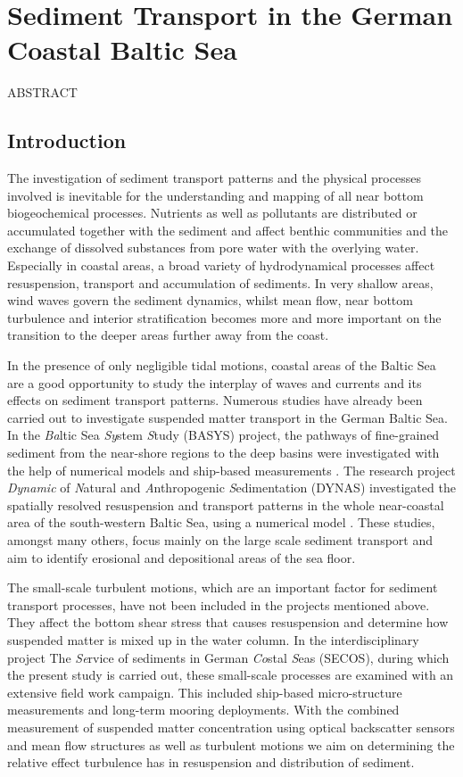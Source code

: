 \chapter{Sediment Transport in the German Coastal Baltic Sea}
\label{kap-measure}

ABSTRACT

\section{Introduction}

The investigation of sediment transport patterns and the physical processes 
involved is inevitable for the understanding and mapping of all near bottom 
biogeochemical processes. Nutrients as well as pollutants are distributed or 
accumulated together with the sediment and affect benthic communities and the 
exchange of dissolved substances from pore water with the overlying water. 
Especially in coastal areas, a broad variety of hydrodynamical processes affect 
resuspension, transport and accumulation of sediments. In very shallow areas, 
wind waves govern the sediment dynamics, whilst mean flow, near bottom 
turbulence and interior stratification becomes more and more important on the 
transition to the deeper areas further away from the coast.

In the presence of only negligible tidal motions, coastal areas of the Baltic 
Sea are a good opportunity to study the interplay of waves and currents and its 
effects on sediment transport patterns. Numerous studies have already been 
carried out to investigate suspended matter transport in the German Baltic Sea. 
In the \textit{Ba}ltic Sea \textit{Sy}stem \textit{S}tudy (BASYS) project, the 
pathways of fine-grained sediment from the near-shore regions to the deep 
basins were investigated with the help of numerical models and ship-based 
measurements \citep[][]{basys1, basys2, leipe2000}. The research project 
\textit{Dynamic} of \textit{N}atural and \textit{A}nthropogenic 
\textit{S}edimentation (DYNAS) investigated the spatially resolved 
resuspension and transport patterns in the whole near-coastal area of the 
south-western Baltic Sea, using a numerical model 
\citep[][]{dynas1, dynas2}. These studies, amongst many others, focus mainly on 
the large scale sediment transport and aim to identify erosional and 
depositional areas of the sea floor. 

The small-scale turbulent motions, which are an important factor for sediment 
transport processes, have not been included in the projects mentioned above. 
They affect the bottom shear stress that causes resuspension and determine how 
suspended matter is mixed up in the water column. In the interdisciplinary 
project The \textit{Se}rvice of sediments in German \textit{Co}stal 
\textit{S}eas (SECOS), during which the present study is carried out, these 
small-scale processes are examined with an extensive field work campaign. This 
included ship-based micro-structure measurements and long-term mooring 
deployments. With the combined measurement of suspended matter concentration 
using optical backscatter sensors and mean flow structures as well as turbulent 
motions we aim on determining the relative effect turbulence has in 
resuspension and distribution of sediment. 

